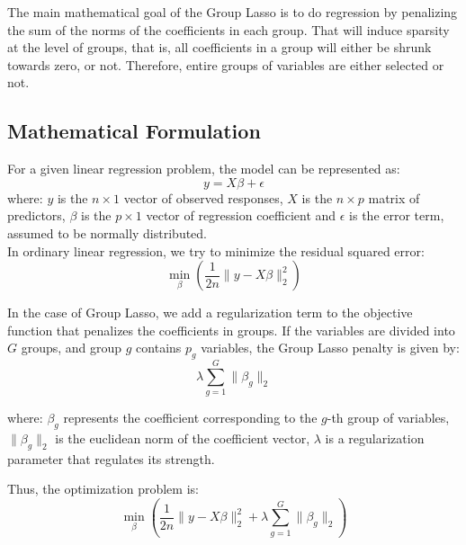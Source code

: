 \documentclass[a4paper, 12pt]{article}
\begin{document}
\begin{multicols}{2}
The main mathematical goal of the Group Lasso is to do regression by penalizing the sum of the norms of the coefficients in each group. That will induce sparsity at the level of groups, that is, all coefficients in a group will either be shrunk towards zero, or not. Therefore, entire groups of variables are either selected or not.

\subsection{Mathematical Formulation} \vspace{-3pt}
For a given linear regression problem, the model can be represented as:
\begin{equation}
y=X\beta + \epsilon
\end{equation}
where: $y$ is the $n \times 1$ vector of observed responses, $X$ is the $n \times p$ matrix of predictors, $\beta$ is the $p \times 1$ vector of regression coefficient and $\epsilon$ is the error term, assumed to be normally distributed.\\

In ordinary linear regression, we try to minimize the residual squared error: \begin{equation} \min_{\beta}\left (\frac{1}{2n}\lVert y-X\beta\rVert^{2}_{2} \right) 
\end{equation}

In the case of Group Lasso, we add a regularization term to the objective function that penalizes the coefficients in groups. If the variables are divided into $G$ groups, and group $g$ contains $p_{g}$ variables, the Group Lasso penalty is given by: \begin{equation} \lambda \sum_{g=1}^{G}\lVert \beta_{g} \rVert_{2}
\end{equation}

where: $\beta_g$ represents the coefficient corresponding to the $g$-th group of variables, $\lVert \beta_g \rVert_2$ is the euclidean norm of the coefficient vector, $\lambda$ is a regularization parameter that regulates its strength.

Thus, the optimization problem is: \begin{equation}
\min_{\beta}\left (\frac{1}{2n}\lVert y-X\beta\rVert^{2}_{2} + \lambda \sum_{g=1}^{G}\lVert \beta_{g} \rVert_{2}\right)
\end{equation}


\end{multicols}
\end{document}
